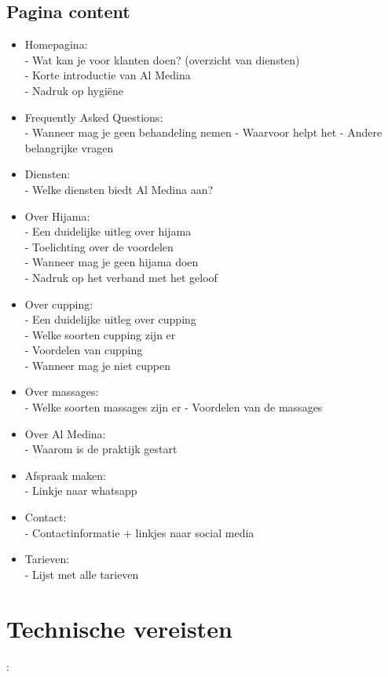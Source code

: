 \documentclass{article}
\begin{document}
\subsection{Pagina content}
\begin{itemize}
    \item Homepagina: \\
    - Wat kan je voor klanten doen? (overzicht van diensten) \\
    - Korte introductie van Al Medina \\
    - Nadruk op hygiëne
    \item Frequently Asked Questions: \\
    - Wanneer mag je geen behandeling nemen
    - Waarvoor helpt het
    - Andere belangrijke vragen
    \item Diensten: \\
    - Welke diensten biedt Al Medina aan?
    \item Over Hijama: \\
    - Een duidelijke uitleg over hijama \\
    - Toelichting over de voordelen \\
    - Wanneer mag je geen hijama doen\\
    - Nadruk op het verband met het geloof
    \item Over cupping: \\
    - Een duidelijke uitleg over cupping\\
    - Welke soorten cupping zijn er\\
    - Voordelen van cupping\\
    - Wanneer mag je niet cuppen
    \item Over massages: \\
    - Welke soorten massages zijn er
    - Voordelen van de massages
    \item Over Al Medina: \\
    - Waarom is de praktijk gestart
    \item Afspraak maken: \\
    - Linkje naar whatsapp
    \item Contact: \\
    - Contactinformatie + linkjes naar social media
    \item Tarieven: \\
    - Lijst met alle tarieven
    
\end{itemize}
\pagebreak
\section{Technische vereisten}:
\end{document}
